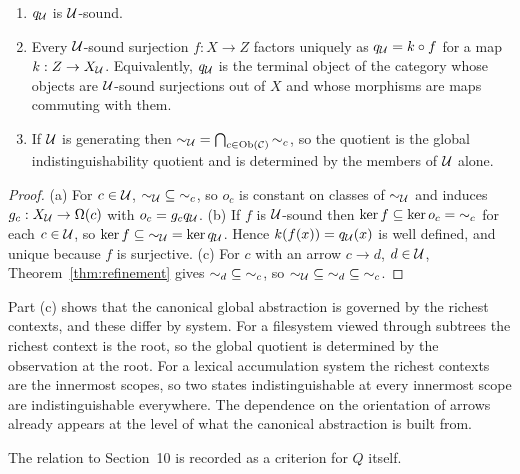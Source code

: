 \begin{theorem}\label{thm:coarsest}
\begin{enumerate}[label=(\alph*)]
\item $q_\mathcal U$ is $\mathcal U$-sound.
\item Every $\mathcal U$-sound surjection $f:X\to Z$ factors uniquely as $q_\mathcal U=k\circ f$ for a map $k:Z\to X_\mathcal U$. Equivalently, $q_\mathcal U$ is the terminal object of the category whose objects are $\mathcal U$-sound surjections out of $X$ and whose morphisms are maps commuting with them.
\item If $\mathcal U$ is generating then ${\sim_\mathcal U}=\bigcap_{c\in\mathrm{Ob}(\mathcal C)}{\sim_c}$, so the quotient is the global indistinguishability quotient and is determined by the members of $\mathcal U$ alone.
\end{enumerate}
\end{theorem}
\begin{proof}
(a) For $c\in\mathcal U$, ${\sim_\mathcal U}\subseteq{\sim_c}$, so $o_c$ is constant on classes of $\sim_\mathcal U$ and induces $g_c:X_\mathcal U\to\Omega(c)$ with $o_c=g_cq_\mathcal U$. (b) If $f$ is $\mathcal U$-sound then $\ker f\subseteq\ker o_c={\sim_c}$ for each $c\in\mathcal U$, so $\ker f\subseteq{\sim_\mathcal U}=\ker q_\mathcal U$. Hence $k(f(x))=q_\mathcal U(x)$ is well defined, and unique because $f$ is surjective. (c) For $c$ with an arrow $c\to d$, $d\in\mathcal U$, Theorem~\ref{thm:refinement} gives ${\sim_d}\subseteq{\sim_c}$, so ${\sim_\mathcal U}\subseteq{\sim_d}\subseteq{\sim_c}$.
\end{proof}

Part (c) shows that the canonical global abstraction is governed by the richest contexts, and these differ by system. For a filesystem viewed through subtrees the richest context is the root, so the global quotient is determined by the observation at the root. For a lexical accumulation system the richest contexts are the innermost scopes, so two states indistinguishable at every innermost scope are indistinguishable everywhere. The dependence on the orientation of arrows already appears at the level of what the canonical abstraction is built from.

The relation to Section~10 is recorded as a criterion for $Q$ itself.

